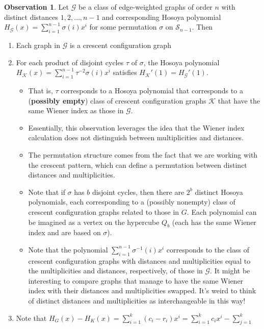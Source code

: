 \documentclass[12]{article}
\theoremstyle{definition}
\newtheorem{obs}{Observation}
\begin{document}
	\begin{obs}
		Let $\mathcal{G}$ be a class of edge-weighted graphs of order $n$ with distinct distances $1, 2, \ldots, n-1$ and corresponding Hosoya polynomial $H_\mathcal{G}(x) = \sum_{i=1}^{n-1} \sigma(i)x^{i}$ for some permutation $\sigma$ on $\mathcal{S}_{n-1}$.  Then 
		
		\begin{enumerate}
			\item Each graph in $\mathcal{G}$ is a crescent configuration graph
			\item For each product of disjoint cycles $\tau$ of $\sigma$, the Hosoya polynomial $H_\mathcal{K}(x) = \sum_{i=1}^{n-1} \tau^{-2}\sigma(i)x^{i}$ satisfies $H_\mathcal{K}'(1) = H_\mathcal{G}'(1)$.  
			
			\begin{itemize}
				\item That is, $\tau$ corresponds to a Hosoya polynomial that corresponds to a (\textbf{possibly empty}) class of crescent configuration graphs $\mathcal{K}$ that have the same Wiener index as those in $\mathcal{G}$.  
				\item Essentially, this observation leverages the idea that the Wiener index calculation does not distinguish between multiplicities and distances.  
				\item The permutation structure comes from the fact that we are working with the crescent pattern, which can define a permutation between distinct distances and multiplicities.
				
				\item Note that if $\sigma$ has $b$ disjoint cycles, then there are $2^b$ distinct Hosoya polynomials, each corresponding to a (possibly nonempty) class of crescent configuration graphs related to those in $G$.  Each polynomial can be imagined as a vertex on the hypercube $Q_b$ (each has the same Wiener index and are based on $\sigma$).
				
				\item Note that the polynomial $\sum_{i=1}^{n-1} \sigma^{-1}(i)x^i$ corresponds to the class of crescent configuration graphs with distances and multiplicities equal to the multiplicities and distances, respectively, of those in $\mathcal{G}$.  It might be interesting to compare graphs that manage to have the same Wiener index with their distances and multiplicities swapped.  It's weird to think of distinct distances and multiplicities as interchangeable in this way!
			\end{itemize}
		
			\item Note that $H_G(x) - H_K(x) = \sum_{i=1}^{k}(c_i-r_i)x^{i} = \sum_{i=1}^k c_ix^i - \sum_{j=1}^k$
		\end{enumerate}
		
	\end{obs}
\end{document}
